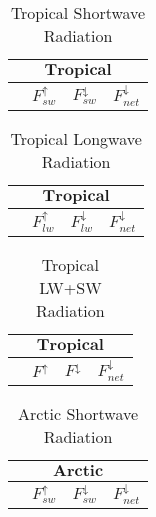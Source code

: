 \documentclass[twocol]{ametsoc}
\begin{document}
\begin{table}[h]
    \centering
    \caption{Tropical Shortwave Radiation}
    \label{tab:tsr}
    \begin{tabular}{lccc}
        \toprule
        \multicolumn{4}{c}{$\textbf{Tropical}$}\\
        \midrule
        & $F^\uparrow_{sw}$ & $F^\downarrow_{sw}$ & $F^\downarrow_{net}$\\
        \midrule
        
        \bottomrule
    \end{tabular}
\end{table}
\begin{table}[h]
    \centering
    \caption{Tropical Longwave Radiation}
    \label{tab:tlr}
    \begin{tabular}{lccc}
        \toprule
        \multicolumn{4}{c}{$\textbf{Tropical}$}\\
        \midrule
        & $F^\uparrow_{lw}$ & $F^\downarrow_{lw}$ & $F^\downarrow_{net}$\\
        \midrule
        
        \bottomrule
    \end{tabular}

\end{table}
\begin{table}[h]
    \centering
    \caption{Tropical LW+SW Radiation}
    \label{tab:tcr}
    \begin{tabular}{lccc}
        \toprule
        \multicolumn{4}{c}{$\textbf{Tropical}$}\\
        \midrule
        & $F^\uparrow$ & $F^\downarrow$ & $F^\downarrow_{net}$\\
        \midrule
        
        \bottomrule
    \end{tabular}

\end{table}

\begin{table}[h]
    \centering
    \caption{Arctic Shortwave Radiation}
    \label{tab:asr}
    \begin{tabular}{lccc}
        \toprule
        \multicolumn{4}{c}{$\textbf{Arctic}$}\\
        \midrule
        & $F^\uparrow_{sw}$ & $F^\downarrow_{sw}$ & $F^\downarrow_{net}$\\
        \midrule
        
        \bottomrule
    \end{tabular}
\end{table}
\end{document}
